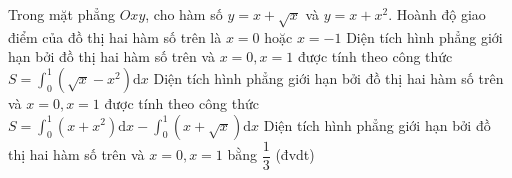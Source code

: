 \begin{ex}
	Trong mặt phẳng $Ox y$, cho hàm số $y=x+\sqrt{x}$ và $y=x+x^2$.
	\choiceTF
	{Hoành độ giao điểm của đồ thị hai hàm số trên là $x=0$ hoặc $x=-1$}
	{\True Diện tích hình phẳng giới hạn bởi đồ thị hai hàm số trên và $x=0, x=1$ được tính theo công thức $S=\int_0^1\left(\sqrt{x}-x^2\right) \mathrm{d} x$}
	{Diện tích hình phẳng giới hạn bởi đồ thị hai hàm số trên và $x=0, x=1$ được tính theo công thức $S=\int_0^1\left(x+x^2\right) \mathrm{d} x-\int_0^1(x+\sqrt{x}) \mathrm{d} x$}
	{\True Diện tích hình phẳng giới hạn bởi đồ thị hai hàm số trên và $x=0, x=1$ bằng $\dfrac{1}{3}$ (đvdt)}
\end{ex}
